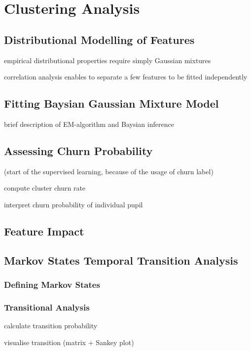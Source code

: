 \section{Clustering Analysis}
\label{sec:clustering}

\subsection{Distributional Modelling of Features}

empirical distributional properties require simply Gaussian mixtures

correlation analysis enables to separate a few features to be fitted independently

\subsection{Fitting Baysian Gaussian Mixture Model}

brief description of EM-algorithm and Baysian inference

\subsection{Assessing Churn Probability}

(start of the supervised learning, because of the usage of churn label)

compute cluster churn rate

interpret churn probability of individual pupil

\subsection{Feature Impact}

\subsection{Markov States Temporal Transition Analysis}

\subsubsection{Defining Markov States}

\subsubsection{Transitional Analysis}

calculate transition probability

visualise transition (matrix + Sankey plot) \cite{hmm2015}